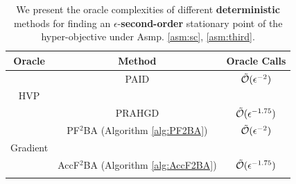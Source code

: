 \documentclass[twoside,11pt]{article}
\begin{document}



\begin{table}[t]
    \centering
    \caption{
    {We present the oracle complexities of different \textbf{deterministic} methods for finding an $\epsilon$-\textbf{second-order} stationary point of the hyper-objective under Asmp. \ref{asm:sc}, \ref{asm:third}.}} 
    \label{tab:res-2nd}
    \begin{tabular}{c c c}
    \hline 
    Oracle     & Method  & Oracle Calls    \\
    \hline 
    \addlinespace
    & PAID \citep{huang2022efficiently}  & $\tilde {{\mathcal{O}}}( \epsilon^{-2} )$  \\ [-0.12cm] 
    HVP \\[-0.12cm]
    & PRAHGD \citep{yang2023accelerating} & $\tilde {{\mathcal{O}}}(\epsilon^{-1.75})$ \\ \addlinespace
    \hline 
    \addlinespace
    & PF${}^2$BA (Algorithm \ref{alg:PF2BA}) &$ \tilde {{\mathcal{O}}}(  \epsilon^{-2})$  \\[-0.12cm]
    Gradient \\[-0.12cm]
& AccF${}^2$BA (Algorithm \ref{alg:AccF2BA})
    & $ \tilde {{\mathcal{O}}}( \epsilon^{-1.75})$  \\ 
     \addlinespace
     \hline
    \end{tabular}
\end{table}
\end{document}
